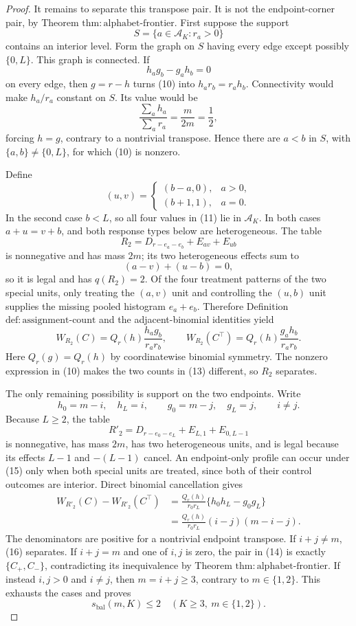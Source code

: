 \documentclass{article}
\begin{document}
\begin{proof}
It remains to separate this transpose pair. It is not the endpoint-corner pair, by Theorem \(\mathrm{thm{:}alphabet\text{-}frontier}\). First suppose the support
\[
S=\{a\in\mathcal A_K:r_a>0\}
\]
contains an interior level. Form the graph on \(S\) having every edge except possibly \(\{0,L\}\). This graph is connected. If
\[
h_ag_b-g_ah_b=0 \tag{10}
\]
on every edge, then \(g=r-h\) turns (10) into \(h_ar_b=r_ah_b\). Connectivity would make \(h_a/r_a\) constant on \(S\). Its value would be
\[
\frac{\sum_a h_a}{\sum_a r_a}=\frac{m}{2m}=\frac12,
\]
forcing \(h=g\), contrary to a nontrivial transpose. Hence there are \(a<b\) in \(S\), with \(\{a,b\}\neq\{0,L\}\), for which (10) is nonzero.

Define
\[
(u,v)=
\begin{cases}
(b-a,0),&a>0,\\
(b+1,1),&a=0.
\end{cases} \tag{11}
\]
In the second case \(b<L\), so all four values in (11) lie in \(\mathcal A_K\). In both cases \(a+u=v+b\), and both response types below are heterogeneous. The table
\[
R_2=D_{r-e_a-e_b}+E_{av}+E_{ub} \tag{12}
\]
is nonnegative and has mass \(2m\); its two heterogeneous effects sum to
\[
(a-v)+(u-b)=0,
\]
so it is legal and has \(q(R_2)=2\). Of the four treatment patterns of the two special units, only treating the \((a,v)\) unit and controlling the \((u,b)\) unit supplies the missing pooled histogram \(e_a+e_b\). Therefore Definition \(\mathrm{def{:}assignment\text{-}count}\) and the adjacent-binomial identities yield
\[
W_{R_2}(C)=Q_r(h)\frac{h_ag_b}{r_ar_b},
\qquad
W_{R_2}(C^\top)=Q_r(h)\frac{g_ah_b}{r_ar_b}. \tag{13}
\]
Here \(Q_r(g)=Q_r(h)\) by coordinatewise binomial symmetry. The nonzero expression in (10) makes the two counts in (13) different, so \(R_2\) separates.

The only remaining possibility is support on the two endpoints. Write
\[
h_0=m-i,\quad h_L=i,\qquad
g_0=m-j,\quad g_L=j,\qquad i\neq j. \tag{14}
\]
Because \(L\geq2\), the table
\[
R'_2=D_{r-e_0-e_L}+E_{L,1}+E_{0,L-1} \tag{15}
\]
is nonnegative, has mass \(2m\), has two heterogeneous units, and is legal because its effects \(L-1\) and \(-(L-1)\) cancel. An endpoint-only profile can occur under (15) only when both special units are treated, since both of their control outcomes are interior. Direct binomial cancellation gives
\[
\begin{aligned}
W_{R'_2}(C)-W_{R'_2}(C^\top)
&=\frac{Q_r(h)}{r_0r_L}
\{h_0h_L-g_0g_L\}\\
&=\frac{Q_r(h)}{r_0r_L}(i-j)(m-i-j). \tag{16}
\end{aligned}
\]
The denominators are positive for a nontrivial endpoint transpose. If \(i+j\neq m\), (16) separates. If \(i+j=m\) and one of \(i,j\) is zero, the pair in (14) is exactly \(\{C_+,C_-\}\), contradicting its inequivalence by Theorem \(\mathrm{thm{:}alphabet\text{-}frontier}\). If instead \(i,j>0\) and \(i\neq j\), then \(m=i+j\geq3\), contrary to \(m\in\{1,2\}\). This exhausts the cases and proves
\[
s_{\mathrm{bal}}(m,K)\leq2
\quad(K\geq3,\ m\in\{1,2\}). \tag{17}
\]


\end{proof}
\end{document}
